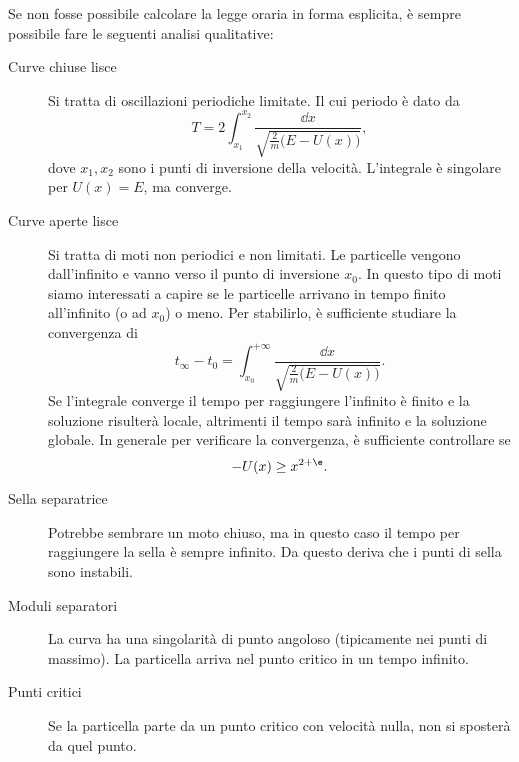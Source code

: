 \begin{enumerate}
	      Se non fosse possibile calcolare la legge oraria in forma esplicita, è sempre possibile fare le seguenti analisi qualitative:
	      \begin{description}
		      \item[Curve chiuse lisce] Si tratta di oscillazioni periodiche limitate. Il cui periodo è dato da
			      \[
				      T = 2\int_{x_1}^{x_2} \frac{\dd x}{\sqrt{\frac{2}{m}\big(E-U(x)\big)}},
			      \]
			      dove \(x_1,x_2\) sono i punti di inversione della velocità.
			      L'integrale è singolare per \(U(x)=E\), ma converge.
		      \item[Curve aperte lisce] Si tratta di moti non periodici e non limitati.
			      Le particelle vengono dall'infinito e vanno verso il punto di inversione \(x_0\).
			      In questo tipo di moti siamo interessati a capire se le particelle arrivano in tempo finito all'infinito (o ad \(x_0\)) o meno. Per stabilirlo, è sufficiente studiare la convergenza di 
			      \[
				      t_{\infty} - t_0 = \int_{x_0}^{+\infty} \frac{\dd x}{\sqrt{\frac{2}{m}\big(E-U(x)\big)}}.
			      \]
			      Se l'integrale converge il tempo per raggiungere l'infinito è finito e la soluzione risulterà locale, altrimenti il tempo sarà infinito e la soluzione globale.
			      In generale per verificare la convergenza, è sufficiente controllare se
			      \[
				      -U(x) \ge x^{2+\e}.
			      \]
		      \item[Sella separatrice] Potrebbe sembrare un moto chiuso, ma in questo caso il tempo per raggiungere la sella è sempre infinito.
			      Da questo deriva che i punti di sella sono instabili.
		      \item[Moduli separatori] La curva ha una singolarità di punto angoloso (tipicamente nei punti di massimo).
			      La particella arriva nel punto critico in un tempo infinito.
		      \item[Punti critici] Se la particella parte da un punto critico con velocità nulla, non si sposterà da quel punto.
	      \end{description}
\end{enumerate}
